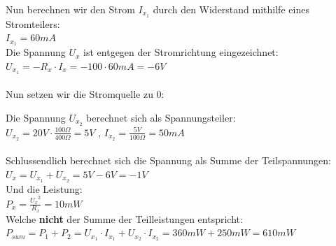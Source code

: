 																					Nun berechnen wir den Strom $I_{x_1}$ durch den Widerstand mithilfe eines Stromteilers: \\
																					$I_{x_1} = 60mA$ \\
																					Die Spannung $U_x$ ist entgegen der Stromrichtung eingezeichnet: \\
																					$U_{x_1} = - R_x \cdot I_x = - 100 \cdot 60mA = -6V $ \\
																					\\
																					Nun setzen wir die Stromquelle zu 0: \\
																					\begin{center}
																						\fix
																					\end{center}

																					Die Spannung $U_{x_2}$ berechnet sich als Spannungsteiler: \\
																					$U_{x_2} = 20V \cdot \frac{100\Omega}{400\Omega} = 5V$ , $ I_{x_2} = \frac{5V}{100\Omega} = 50mA $\\
																					\\
																					Schlussendlich berechnet sich die Spannung als Summe der Teilspannungen:
																					$U_x = U_{x_1} + U_{x_2} = 5V -6V = -1V $ \\
																					Und die Leistung: \\
																					$P_x = \frac{{U_x}^2}{R_x} = 10mW$ \\
																					Welche \textbf{nicht} der Summe der Teilleistungen entspricht: \\
																					$P_{sum} = P_1 + P_2 = U_{x_1} \cdot I_{x_1} + U_{x_2} \cdot I_{x_2} = 360mW + 250mW = 610mW$


																				 \iend



